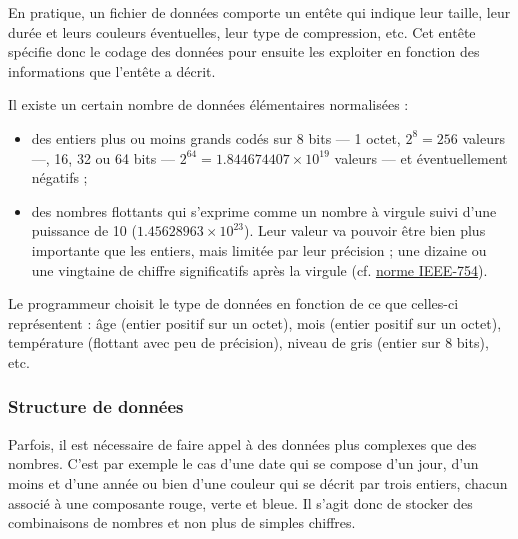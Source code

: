 En pratique, un fichier de données comporte un entête qui indique leur taille, leur durée et leurs couleurs éventuelles, leur type de compression, etc. Cet entête spécifie donc le codage des données pour ensuite les exploiter en fonction des informations que l'entête a décrit.

Il existe un certain nombre de données élémentaires normalisées : 
\begin{itemize}
	\item des entiers plus ou moins grands codés sur 8 bits --- 1 octet, $2^8 = 256$ valeurs ---, 16, 32 ou 64 bits --- $2^{64} = \num{1.844674407}×10^{19}$ valeurs --- et éventuellement négatifs ;
	\item des nombres flottants qui s'exprime comme un nombre à virgule suivi d'une puissance de 10 ($\num{1.45628963} \times 10^{23}$). Leur valeur va pouvoir être bien plus importante que les entiers, mais limitée par leur précision ; une dizaine ou une vingtaine de chiffre significatifs après la virgule (cf. \href{https://fr.wikipedia.org/wiki/IEEE_754}{norme IEEE-754}).
\end{itemize}

Le programmeur choisit le type de données en fonction de ce que celles-ci représentent : âge (entier positif sur un octet), mois (entier positif sur un octet), température (flottant avec peu de précision), niveau de gris (entier sur 8 bits), etc.

\subsubsection[Structure de données]{Structure de données}
\label{subsub:V.3.2.2}

Parfois, il est nécessaire de faire appel à des données plus complexes que des nombres. C'est par exemple le cas d'une date qui se compose d'un jour, d'un moins et d'une année ou bien d'une couleur qui se décrit par trois entiers, chacun associé à une composante rouge, verte et bleue. Il s'agit donc de stocker des combinaisons de nombres et non plus de simples chiffres.

